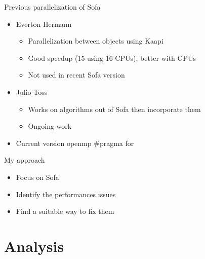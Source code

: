 \documentclass[xcolor={usenames,dvipsnames}]{beamer}
\newcommand{\sectiontitle}{}
\newcommand{\newsection}[1]{\renewcommand{\sectiontitle}{#1}\section{#1}}
\begin{document}
\begin{frame}{Previous parallelization of Sofa}
    \begin{itemize}[<+->]
        \item Everton Hermann \cite{Hermann10Simulations} \\
            \begin{itemize}
                \item Parallelization between objects using Kaapi
                \item Good speedup (15 using 16 CPUs), better with GPUs
                \item Not used in recent Sofa version 
            \end{itemize}
        \item Julio Toss \cite{Toss12New}
            \begin{itemize}
                \item Works on algorithms out of Sofa then incorporate them
                \item Ongoing work
            \end{itemize}
        \item Current version openmp \#pragma for
    \end{itemize}
    \pause
    \begin{alertblock}{My approach}
        \begin{itemize}
            \item Focus on Sofa 
            \item \alert{Identify the performances issues}
            \item Find a suitable way to fix them
        \end{itemize}
    \end{alertblock}

\end{frame}

\newsection{Analysis}
\end{document}
